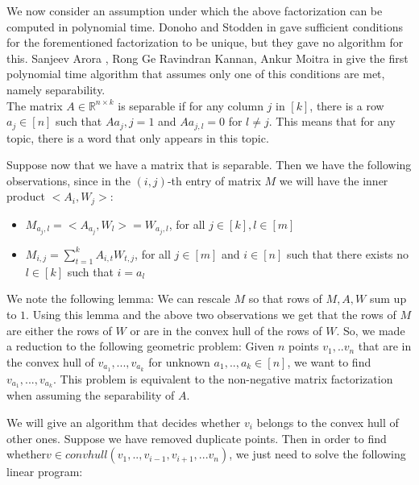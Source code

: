 \documentclass[11pt]{article}
\begin{document}
We now consider an assumption under which the above factorization can be computed in polynomial time. Donoho and Stodden in \cite{DonoVi} gave sufficient conditions for the forementioned factorization to be unique, but they gave no algorithm for this.  Sanjeev Arora ,
               Rong Ge 
               Ravindran Kannan,
               Ankur Moitra in \cite{ProvMax} give the first polynomial time algorithm that assumes only one of this conditions are met, namely separability. \\
               
               
The matrix $A \in \mathbb{R} ^{n\times k}$ is separable if for any column $j$ in $[k]$, there is a row $a_j \in [n]$ such that $Aa_{j},j =1 $ and $Aa_{j,l}= 0$ for $ l \neq j$. This means that for any topic, there is a word that only appears in this topic.


Suppose now that we have a matrix that is separable. Then we have the following observations, since in the $(i,j)$-th entry of matrix $M$ we will have the inner product $<A_i,W_j>$:


\begin{itemize}

\item $M_{a_j,l} = <A_{a_j}, W_l > = W_{a_j,l} $, for all $j \in [k],l \in [m]$
\item $M_{i,j} = \sum_{t=1}^k A_{i,t} W_{t,j}$, for all $j \in [m]$ and $ i \in [n]$ such that there exists no $l \in [k]$ such that $i = a_l$

\end{itemize}

We note the following lemma: We can rescale $M$ so that rows of $M,A,W$ sum up to $1$.
Using this lemma and the above two observations we get that the rows of $M$ are either the rows of $W$ or are in the convex hull of the rows of $W$. So, we made a reduction to the following geometric problem: Given $n$ points $v_1,..v_n$ that are in the convex hull of $v_{a_1},...,v_{a_k}$ for unknown $a_1,..,a_k \in [n]$, we want to find $v_{a_1},...,v_{a_k}$. This problem is equivalent to the non-negative matrix factorization when assuming the separability of $A$. 

We will give an algorithm that decides whether $v_i$ belongs to the convex hull of other ones. Suppose we have removed duplicate points. Then in order to find whether$ v \in convhull(v_1,..,v_{i-1},v_{i+1},...v_{n})$, we just need to solve the following linear program:
\end{document}
